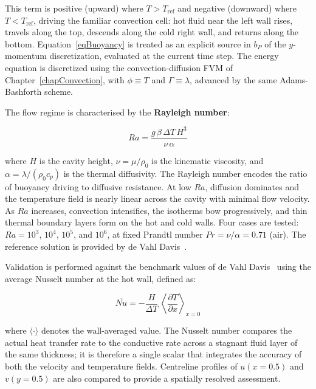 This term is positive (upward) where $T > T_\mathrm{ref}$ and negative (downward) where $T < T_\mathrm{ref}$, driving the familiar convection cell: hot fluid near the left wall rises, travels along the top, descends along the cold right wall, and returns along the bottom. Equation~\eqref{eqBuoyancy} is treated as an explicit source in $b_P$ of the $y$-momentum discretization, evaluated at the current time step. The energy equation is discretized using the convection-diffusion FVM of Chapter~\ref{chapConvection}, with $\phi \equiv T$ and $\Gamma \equiv \lambda$, advanced by the same Adams-Bashforth scheme.

The flow regime is characterised by the \textbf{Rayleigh number}:

\begin{equation}\label{eqRayleigh}
    Ra = \frac{g\,\beta\,\Delta T\,H^3}{\nu\,\alpha}
\end{equation}

where $H$ is the cavity height, $\nu = \mu/\rho_0$ is the kinematic viscosity, and $\alpha = \lambda/(\rho_0 c_p)$ is the thermal diffusivity. The Rayleigh number encodes the ratio of buoyancy driving to diffusive resistance. At low $Ra$, diffusion dominates and the temperature field is nearly linear across the cavity with minimal flow velocity. As $Ra$ increases, convection intensifies, the isotherms bow progressively, and thin thermal boundary layers form on the hot and cold walls. Four cases are tested: $Ra = 10^3$, $10^4$, $10^5$, and $10^6$, at fixed Prandtl number $Pr = \nu/\alpha = 0.71$ (air). The reference solution is provided by de Vahl Davis~\cite{deVahlDavis1983}.

Validation is performed against the benchmark values of de Vahl Davis~\cite{deVahlDavis1983} using the average Nusselt number at the hot wall, defined as:

\begin{equation}\label{eqNusselt}
    \overline{Nu} = -\frac{H}{\Delta T}\,\left\langle\frac{\partial T}{\partial x}\right\rangle_{x=0}
\end{equation}

where $\langle \cdot \rangle$ denotes the wall-averaged value. The Nusselt number compares the actual heat transfer rate to the conductive rate across a stagnant fluid layer of the same thickness; it is therefore a single scalar that integrates the accuracy of both the velocity and temperature fields. Centreline profiles of $u(x = 0.5)$ and $v(y = 0.5)$ are also compared to provide a spatially resolved assessment.


